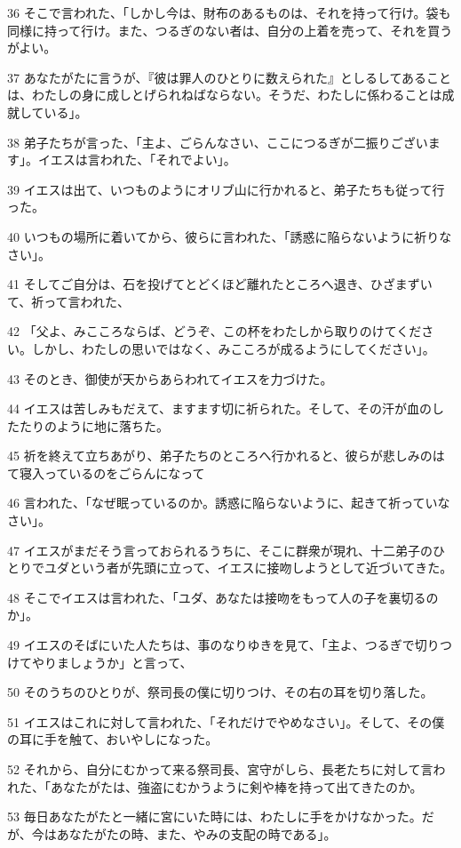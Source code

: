 \par 36 そこで言われた、「しかし今は、財布のあるものは、それを持って行け。袋も同様に持って行け。また、つるぎのない者は、自分の上着を売って、それを買うがよい。
\par 37 あなたがたに言うが、『彼は罪人のひとりに数えられた』としるしてあることは、わたしの身に成しとげられねばならない。そうだ、わたしに係わることは成就している」。
\par 38 弟子たちが言った、「主よ、ごらんなさい、ここにつるぎが二振りございます」。イエスは言われた、「それでよい」。
\par 39 イエスは出て、いつものようにオリブ山に行かれると、弟子たちも従って行った。
\par 40 いつもの場所に着いてから、彼らに言われた、「誘惑に陥らないように祈りなさい」。
\par 41 そしてご自分は、石を投げてとどくほど離れたところへ退き、ひざまずいて、祈って言われた、
\par 42 「父よ、みこころならば、どうぞ、この杯をわたしから取りのけてください。しかし、わたしの思いではなく、みこころが成るようにしてください」。
\par 43 そのとき、御使が天からあらわれてイエスを力づけた。
\par 44 イエスは苦しみもだえて、ますます切に祈られた。そして、その汗が血のしたたりのように地に落ちた。
\par 45 祈を終えて立ちあがり、弟子たちのところへ行かれると、彼らが悲しみのはて寝入っているのをごらんになって
\par 46 言われた、「なぜ眠っているのか。誘惑に陥らないように、起きて祈っていなさい」。
\par 47 イエスがまだそう言っておられるうちに、そこに群衆が現れ、十二弟子のひとりでユダという者が先頭に立って、イエスに接吻しようとして近づいてきた。
\par 48 そこでイエスは言われた、「ユダ、あなたは接吻をもって人の子を裏切るのか」。
\par 49 イエスのそばにいた人たちは、事のなりゆきを見て、「主よ、つるぎで切りつけてやりましょうか」と言って、
\par 50 そのうちのひとりが、祭司長の僕に切りつけ、その右の耳を切り落した。
\par 51 イエスはこれに対して言われた、「それだけでやめなさい」。そして、その僕の耳に手を触て、おいやしになった。
\par 52 それから、自分にむかって来る祭司長、宮守がしら、長老たちに対して言われた、「あなたがたは、強盗にむかうように剣や棒を持って出てきたのか。
\par 53 毎日あなたがたと一緒に宮にいた時には、わたしに手をかけなかった。だが、今はあなたがたの時、また、やみの支配の時である」。
